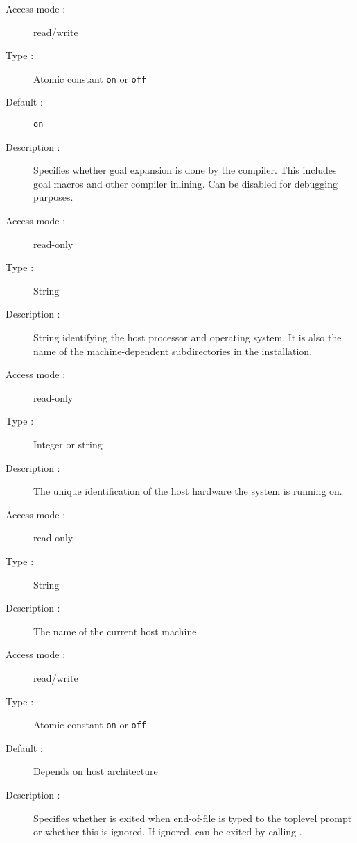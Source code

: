 \begin{description}
\begin{description}
\item[Access mode : ] read/write 
\item[Type : ] Atomic constant {\tt on} or {\tt off} 
\item[Default : ] {\tt on}
\item[Description : ] Specifies whether goal expansion is done by the compiler.
This includes goal macros and other compiler inlining.
Can be disabled for debugging purposes.
\end{description}

\pagebreak[3]
\begin{description}
\item[Access mode :] read-only
\item[Type :] String
\item[Description :] String identifying the host processor and operating
system. It is also the name of the machine-dependent subdirectories in the
{\eclipse} installation.
\end{description}

\begin{description}
\item[Access mode :] read-only
\item[Type :] Integer or string
\item[Description :] The unique identification of the host hardware
the system is running on.
\end{description}

\begin{description}
\item[Access mode :] read-only
\item[Type :] String
\item[Description :] The name of the current host machine.
\end{description}

\begin{description}
\item[Access mode : ] read/write 
\item[Type : ] Atomic constant {\tt on} or {\tt off} 
\item[Default : ] Depends on host architecture
\item[Description : ] Specifies whether {\eclipse} is exited
when end-of-file is typed to the toplevel prompt or whether this is ignored.
If ignored, {\eclipse} can be exited by calling
.
\end{description}


\end{description}
